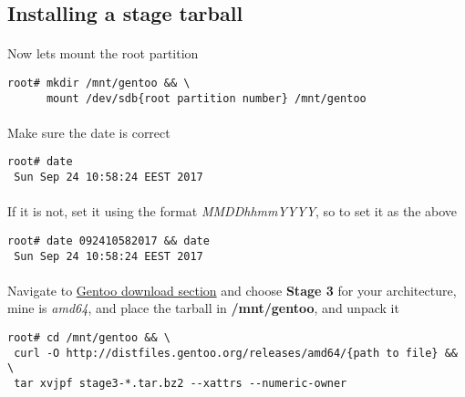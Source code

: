 \documentclass[10pt,a4paper]{article}
\begin{document}
        \newpage
        \subsection{ Installing a stage tarball }
            \paragraph{} Now lets mount the root partition

\begin{lstlisting}[style=BashInputRoot]
root# mkdir /mnt/gentoo && \
      mount /dev/sdb{root partition number} /mnt/gentoo 
\end{lstlisting}
                
            \paragraph{} Make sure the date is correct

\begin{lstlisting}[style=BashInputRoot]
root# date
 Sun Sep 24 10:58:24 EEST 2017
\end{lstlisting}
            
            \paragraph{} If it is not, set it using the format \textit{MMDDhhmmYYYY}, so to set it as the above

\begin{lstlisting}[style=BashInputRoot]
root# date 092410582017 && date
 Sun Sep 24 10:58:24 EEST 2017
\end{lstlisting}
            
            \paragraph{} Navigate to \href{https://www.gentoo.org/downloads/}{Gentoo download section} and choose \textbf{Stage 3} for your architecture, mine is \textit{amd64}, and place the tarball in \textbf{/mnt/gentoo}, and unpack it
            
\begin{lstlisting}[style=BashInputRoot]
root# cd /mnt/gentoo && \
 curl -O http://distfiles.gentoo.org/releases/amd64/{path to file} && \
 tar xvjpf stage3-*.tar.bz2 --xattrs --numeric-owner 
\end{lstlisting}
\end{document}
